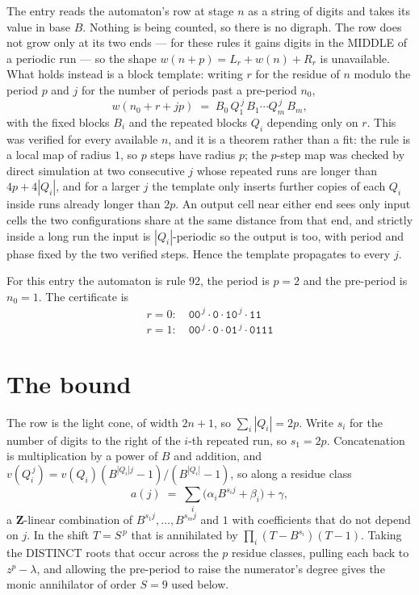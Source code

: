 \documentclass[11pt,a4paper]{article}
\theoremstyle{plain}
\theoremstyle{definition}
\begin{document}
The entry reads the automaton's row at stage $n$ as a string of digits and takes its value in
base $B$. Nothing is being counted, so there is no digraph. The row does not grow only at its
two ends --- for these rules it gains digits in the MIDDLE of a periodic run --- so the shape
$w(n+p)=L_r+w(n)+R_r$ is unavailable. What holds instead is a block template: writing $r$ for
the residue of $n$ modulo the period $p$ and $j$ for the number of periods past a pre-period
$n_0$,
\[
w(n_0 + r + jp)\;=\;B_0\,Q_1^{\,j}\,B_1\cdots Q_m^{\,j}\,B_m,
\]
with the fixed blocks $B_i$ and the repeated blocks $Q_i$ depending only on $r$. This was
verified for every available $n$, and it is a theorem rather than a fit: the rule is a local
map of radius $1$, so $p$ steps have radius $p$; the $p$-step map was checked by direct
simulation at two consecutive $j$ whose repeated runs are longer than $4p+4|Q_i|$, and for a
larger $j$ the template only inserts further copies of each $Q_i$ inside runs already longer
than $2p$. An output cell near either end sees only input cells the two configurations share
at the same distance from that end, and strictly inside a long run the input is
$|Q_i|$-periodic so the output is too, with period and phase fixed by the two verified steps.
Hence the template propagates to every $j$.

For this entry the automaton is rule 92, the period is $p=2$ and the pre-period is $n_0=1$.
The certificate is
\begin{gather*}
r=0:\quad \texttt{00}^{\,j} \cdot \texttt{0} \cdot \texttt{10}^{\,j} \cdot \texttt{11} \\
r=1:\quad \texttt{00}^{\,j} \cdot \texttt{0} \cdot \texttt{01}^{\,j} \cdot \texttt{0111}
\end{gather*}

\section{The bound}

The row is the light cone, of width $2n+1$, so $\sum_i|Q_i|=2p$. Write $s_i$ for the number of
digits to the right of the $i$-th repeated run, so $s_1=2p$. Concatenation is multiplication by
a power of $B$ and addition, and $v(Q_i^{\,j})=v(Q_i)(B^{|Q_i|j}-1)/(B^{|Q_i|}-1)$, so along a
residue class
\[
a(j)\;=\;\sum_i \big(\alpha_i B^{s_i j} + \beta_i\big) + \gamma,
\]
a $\mathbf{Z}$-linear combination of $B^{s_1 j},\dots,B^{s_m j}$ and $1$ with coefficients that
do not depend on $j$. In the shift $T=S^{\,p}$ that is annihilated by
$\prod_i(T-B^{s_i})(T-1)$. Taking the DISTINCT roots that occur across the $p$ residue classes,
pulling each back to $z^p-\lambda$, and allowing the pre-period to raise the numerator's degree
gives the monic annihilator of order $S=9$ used below.
\end{document}
